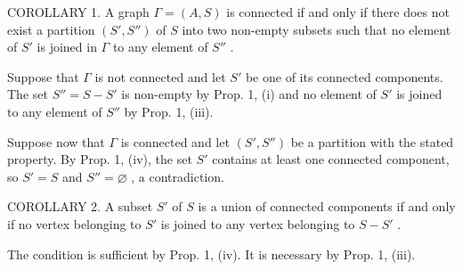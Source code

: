 COROLLARY 1. A graph \(\Gamma = (A, S)\) is connected if and only if there does not exist a partition \((S', S'')\) of \(S\) into two non-empty subsets such that no element of \(S'\) is joined in \(\Gamma\) to any element of \(S''\) .

Suppose that \(\Gamma\) is not connected and let \(S'\) be one of its connected components. The set \(S'' = S - S'\) is non-empty by Prop. 1, (i) and no element of \(S'\) is joined to any element of \(S''\) by Prop. 1, (iii).

Suppose now that \(\Gamma\) is connected and let \((S', S'')\) be a partition with the stated property. By Prop. 1, (iv), the set \(S'\) contains at least one connected component, so \(S' = S\) and \(S'' = \varnothing\) , a contradiction.

COROLLARY 2. A subset \(S'\) of \(S\) is a union of connected components if and only if no vertex belonging to \(S'\) is joined to any vertex belonging to \(S - S'\) .

The condition is sufficient by Prop. 1, (iv). It is necessary by Prop. 1, (iii).

\relax{}
